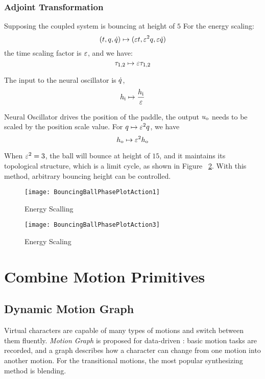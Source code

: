 \subsubsection*{Adjoint Transformation}
Supposing the coupled system is bouncing at height of $5$
For the energy scaling:
\[
(t,q,\dot{q} ) \mapsto ( \varepsilon t ,\varepsilon^2 q,\varepsilon \dot{q})
\]
the time scaling factor is $\varepsilon$, and we have:
\[
\tau_{1,2} \mapsto \varepsilon \tau_{1,2}
\]

The input to the neural oscillator is $\dot{q}$,
\[
h_{\mathrm{i}} \mapsto \frac{h_{\mathrm{i}}}{\varepsilon}
\]
 
Neural Oscillator drives the position of the paddle, the output $u_{\mathrm{o}}$ needs to be scaled by the position scale value.
For $q \mapsto \varepsilon^2q$, we have
\[
 h_{\mathrm{o}} \mapsto \varepsilon^2 h_{\mathrm{o}}
\]

When $\varepsilon^2=3$,  the ball will bounce at height of $15$, and it maintains its topological structure, which is a limit cycle, as shown in Figure ~\ref{fig:energy3}. 
With this method, arbitrary bouncing height can be controlled.


\begin{figure}[!htbp]
  \begin{center}
   	\texttt{[image: BouncingBallPhasePlotAction1]}
    \caption{Energy Scalling}
    \label{fig:energy1}
  \end{center}
\end{figure} 


\begin{figure}[!htbp]
  \begin{center}
	\texttt{[image: BouncingBallPhasePlotAction3]}
    \caption{Energy Scaling}
    \label{fig:energy3}
  \end{center}
\end{figure}

\section{Combine Motion Primitives}
\label{sec:manyprimitive}

\subsection{Dynamic Motion Graph}
Virtual characters are capable of many types of motions and switch between them fluently.
\emph{Motion Graph}\citep{kovar2008motion} is proposed for data-driven \cms:
basic motion tasks are recorded, and a graph describes how a character can change from one motion into another motion. 
For the transitional motions, the most popular synthesizing method is blending.


